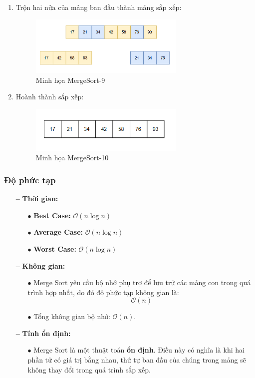 \begin{enumerate}
    \item Trộn hai nửa của mảng ban đầu thành mảng sắp xếp:
    \begin{figure}[H]
        \centering
        \includegraphics[width=0.7\textwidth]{img/merge_sort/9.png}
        \caption{Minh họa MergeSort-9}
    \end{figure}
    
    \item Hoành thành sắp xếp:
    \begin{figure}[H]
        \centering
        \includegraphics[width=0.7\textwidth]{img/merge_sort/10.png}
        \caption{Minh họa MergeSort-10}
    \end{figure}
\end{enumerate}

\subsubsection{Độ phức tạp}
\begin{itemize}
    \item[\textbf{--}] \textbf{Thời gian:}
    \begin{itemize}
        \item[$\bullet$] \textbf{Best Case:} \(\mathcal{O}(n \log n)\)
        \item[$\bullet$] \textbf{Average Case:} \(\mathcal{O}(n \log n)\)
        \item[$\bullet$] \textbf{Worst Case:} \(\mathcal{O}(n \log n)\)
    \end{itemize}
    \item[\textbf{--}] \textbf{Không gian:}
    \begin{itemize}
        \item[$\bullet$] Merge Sort yêu cầu bộ nhớ phụ trợ để lưu trữ các mảng con trong quá trình hợp nhất, do đó độ phức tạp không gian là:
        \[
        \mathcal{O}(n)
        \]
        \item[$\bullet$] Tổng không gian bộ nhớ: \(\mathcal{O}(n)\).
    \end{itemize}
    \item[\textbf{--}] \textbf{Tính ổn định:}
    \begin{itemize}
        \item[$\bullet$] Merge Sort là một thuật toán \textbf{ổn định}. Điều này có nghĩa là khi hai phần tử có giá trị bằng nhau, thứ tự ban đầu của chúng trong mảng sẽ không thay đổi trong quá trình sắp xếp.
    \end{itemize}
\end{itemize}